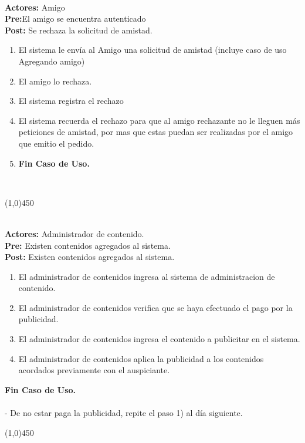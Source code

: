 \documentclass[11pt, a4paper, spanish]{article}
\begin{document}
	 \\
\textbf{Actores:} Amigo \\
\textbf{Pre:}El amigo se encuentra autenticado \\
\textbf{Post:}  Se rechaza la solicitud de amistad.\\
\begin{enumerate}
	\item El sistema le envía al Amigo una solicitud de amistad (incluye caso de uso Agregando amigo)
\item El amigo lo rechaza.
\item El sistema registra el rechazo
\item El sistema recuerda el rechazo para que al amigo rechazante no le lleguen más peticiones de amistad, por mas que estas puedan ser realizadas por el amigo que emitio el pedido.
\item \textbf{Fin Caso de Uso.} \\

\end{enumerate}
 \\
\begin{center} \line(1,0){450} \end{center}




 \\
\textbf{Actores:} Administrador de contenido. \\
\textbf{Pre:} Existen contenidos agregados al sistema. \\
\textbf{Post:} Existen contenidos agregados al sistema.\\
\begin{enumerate}
	\item El administrador de contenidos ingresa al sistema de administracion de contenido.
	\item El administrador de contenidos verifica que se haya efectuado el pago por la publicidad.
	\item El administrador de contenidos ingresa el contenido a publicitar en el sistema.
	\item El administrador de contenidos aplica la publicidad a los contenidos acordados previamente con el auspiciante.

\end{enumerate}
\textbf{Fin Caso de Uso.} \\
 \\
 - De no estar paga la publicidad, repite el paso 1) al día siguiente.
\begin{center} \line(1,0){450} \end{center}
\end{document}
